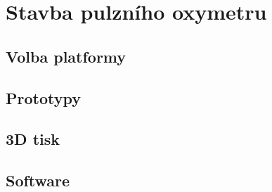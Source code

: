 \section {Stavba pulzního oxymetru}
\subsection {Volba platformy}
\subsection {Prototypy}
\subsection {3D tisk}
\subsection {Software}
